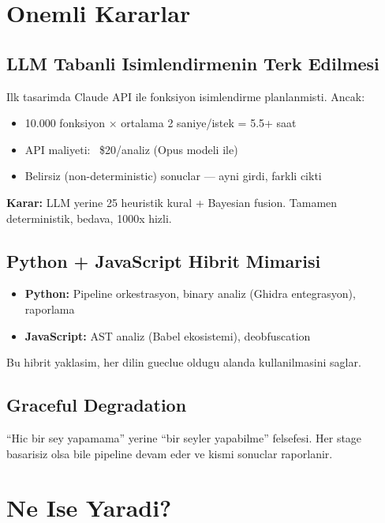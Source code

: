 \documentclass[12pt,a4paper,oneside]{book}
\theoremstyle{definition}
\begin{document}
\section{Onemli Kararlar}

\subsection{LLM Tabanli Isimlendirmenin Terk Edilmesi}

Ilk tasarimda Claude API ile fonksiyon isimlendirme planlanmisti. Ancak:

\begin{itemize}
\item 10.000 fonksiyon $\times$ ortalama 2 saniye/istek = 5.5+ saat
\item API maliyeti: ~\$20/analiz (Opus modeli ile)
\item Belirsiz (non-deterministic) sonuclar --- ayni girdi, farkli cikti
\end{itemize}

\textbf{Karar:} LLM yerine 25 heuristik kural + Bayesian fusion. Tamamen deterministik, bedava, 1000x hizli.

\subsection{Python + JavaScript Hibrit Mimarisi}

\begin{itemize}
\item \textbf{Python:} Pipeline orkestrasyon, binary analiz (Ghidra entegrasyon), raporlama
\item \textbf{JavaScript:} AST analiz (Babel ekosistemi), deobfuscation
\end{itemize}

Bu hibrit yaklasim, her dilin gueclue oldugu alanda kullanilmasini saglar.

\subsection{Graceful Degradation}

``Hic bir sey yapamama'' yerine ``bir seyler yapabilme'' felsefesi. Her stage basarisiz olsa bile pipeline devam eder ve kismi sonuclar raporlanir.

\section{Ne Ise Yaradi?}
\end{document}
